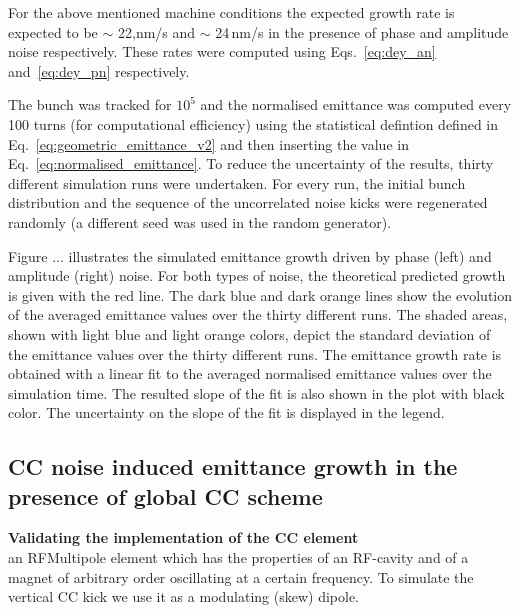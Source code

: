 For the above mentioned machine conditions the expected growth rate is expected to be $\sim$ 22,nm/s and $\sim$ 24\,nm/s in the presence of phase and amplitude noise respectively. These rates were computed using Eqs.~\eqref{eq:dey_an} and~\ref{eq:dey_pn} respectively.


The bunch was tracked for $10^5$ and the normalised emittance was computed every 100 turns (for computational efficiency) using the statistical defintion defined in Eq.~\eqref{eq:geometric_emittance_v2} and then inserting the value in Eq.~\eqref{eq:normalised_emittance}. To reduce the uncertainty of the results, thirty different simulation runs were undertaken. For every run, the initial bunch distribution and the sequence of the uncorrelated noise kicks were regenerated randomly (a different seed was used in the random generator). 

Figure ... illustrates the simulated emittance growth driven by phase (left) and amplitude (right) noise. For both types of noise, the theoretical predicted growth is given with the red line. The dark blue and dark orange lines show the evolution of the averaged emittance values over the thirty different runs. The shaded areas, shown with light blue and light orange colors, depict the standard deviation of the emittance values over the thirty different runs. The emittance growth rate is obtained with a linear fit to the averaged normalised emittance values over the simulation time. The resulted slope of the fit is also shown in the plot with black color. The uncertainty on the slope of the fit is displayed in the legend.


\subsection{CC noise induced emittance growth in the presence of global CC scheme}\label{subsec:global_CC}


\textbf{Validating the implementation of the CC element}\\



an RFMultipole element which  has the properties of an RF-cavity and of a magnet of arbitrary order oscillating at a certain frequency. To simulate the vertical CC kick we use it as a modulating (skew) dipole.



